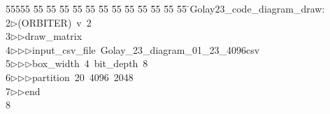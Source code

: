 %
%
\begin{tabbing}
55555 \= 55 \= 55 \= 55 \= 55 \= 55 \= 55 \= 55 \= 55 \= 55 \= 55 \= 55 \= 55 \= \>Golay23\_code\_diagram\_draw:\\[0pt]
2\>$\triangleright$\>(ORBITER)\ v\ 2\ \\[0pt]
3\>$\triangleright$\>$\triangleright$\>draw\_matrix\ \\[0pt]
4\>$\triangleright$\>$\triangleright$\>$\triangleright$\>input\_csv\_file\ Golay\_23\_diagram\_01\_23\_4096csv\ \\[0pt]
5\>$\triangleright$\>$\triangleright$\>$\triangleright$\>box\_width\ 4\ bit\_depth\ 8\ \\[0pt]
6\>$\triangleright$\>$\triangleright$\>$\triangleright$\>partition\ 20\ 4096\ 2048\ \\[0pt]
7\>$\triangleright$\>$\triangleright$\>end\\[0pt]
8\>\end{tabbing}
